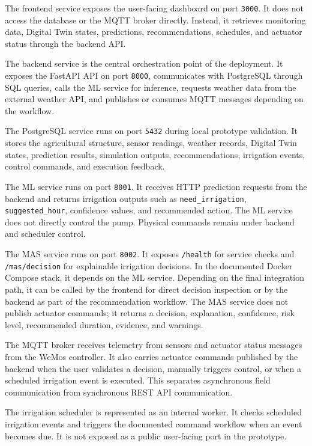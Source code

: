 The frontend service exposes the user-facing dashboard on port \texttt{3000}. It does not access the database or the MQTT broker directly. Instead, it retrieves monitoring data, Digital Twin states, predictions, recommendations, schedules, and actuator status through the backend API.

The backend service is the central orchestration point of the deployment. It exposes the FastAPI API on port \texttt{8000}, communicates with PostgreSQL through SQL queries, calls the ML service for inference, requests weather data from the external weather API, and publishes or consumes MQTT messages depending on the workflow.

The PostgreSQL service runs on port \texttt{5432} during local prototype validation. It stores the agricultural structure, sensor readings, weather records, Digital Twin states, prediction results, simulation outputs, recommendations, irrigation events, control commands, and execution feedback.

The ML service runs on port \texttt{8001}. It receives HTTP prediction requests from the backend and returns irrigation outputs such as \texttt{need\_irrigation}, \texttt{suggested\_hour}, confidence values, and recommended action. The ML service does not directly control the pump. Physical commands remain under backend and scheduler control.

The MAS service runs on port \texttt{8002}. It exposes \texttt{/health} for service checks and \texttt{/mas/decision} for explainable irrigation decisions. In the documented Docker Compose stack, it depends on the ML service. Depending on the final integration path, it can be called by the frontend for direct decision inspection or by the backend as part of the recommendation workflow. The MAS service does not publish actuator commands; it returns a decision, explanation, confidence, risk level, recommended duration, evidence, and warnings.

The MQTT broker receives telemetry from sensors and actuator status messages from the WeMos controller. It also carries actuator commands published by the backend when the user validates a decision, manually triggers control, or when a scheduled irrigation event is executed. This separates asynchronous field communication from synchronous REST API communication.

The irrigation scheduler is represented as an internal worker. It checks scheduled irrigation events and triggers the documented command workflow when an event becomes due. It is not exposed as a public user-facing port in the prototype.

